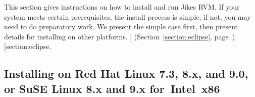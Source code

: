 \newcommand{\AtManualClasspathRootDiscussion}[1]{at
 \link{the discussion of setting up \texttt{CLASSPATH\_ROOT}#1}[; it's in
 Section~\ref{sec:manual-classpath-root}, item~\Ref,
 sub-item~\texttt{CLASS\-PATH\_\-ROOT}, on page~\Pageref]{manual-classpath-root}.}%
This section gives instructions on how to install and run Jikes\TMweb{} RVM.\@
If your system meets certain prerequisites, the install process is
simple; if not, you may need to do preparatory work.  We
present the simple case first, then present details for installing
on other platforms.  
%
[
 (Section~\ref{section:eclipse}, page~\pageref{section:eclipse})%
]{section:eclipse}.\@

\subsection{Installing on Red Hat Linux 7.3, 8.x, and 9.0, or SuSE Linux 8.x and 9.x for~Intel~x86}

